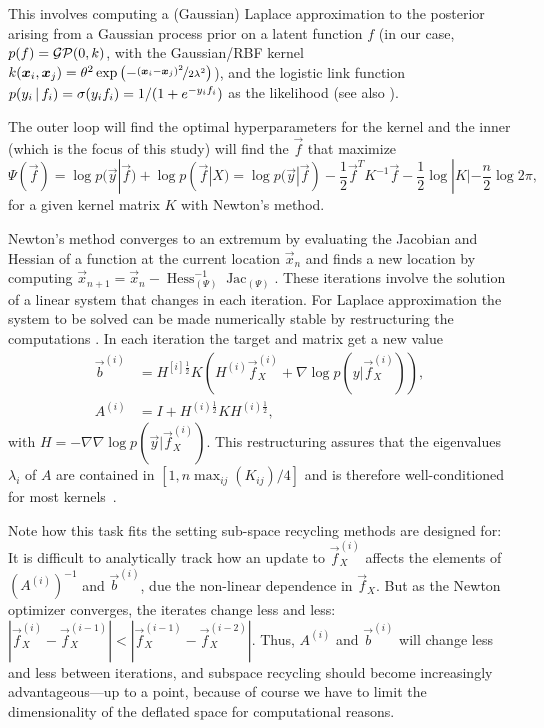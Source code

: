 \documentclass{article}
\begin{document}
This involves computing a (Gaussian) Laplace approximation to the posterior arising from a Gaussian process prior on a latent function $f$ (in our case, $p(f)=\GP(0,k)$, with the Gaussian/RBF kernel $k(\vec{x}_i,\vec{x}_j)=\theta^2 \exp \left(-\nicefrac{(\vec{x}_i-\vec{x}_j)^2}{2\lambda^2}\right)$), and the logistic link function $p(y_i \g f_i) = \sigma(y_i f_i) = 1/(1+e^{-y_if_i})$ as the likelihood (see also \cite[][.3, which also outlines the explicit algorithm]{RW-GPML}). 

The outer loop will find the optimal hyperparameters for the kernel and the inner (which is the focus of this study) will find the $\vec{f}$ that maximize
\begin{equation}
\Psi(\vec{f})=\log p(\vec{y}|\vec{f}) + \log p(\vec{f}|X)=\log p(\vec{y}|\vec{f})-\frac{1}{2}\vec{f}^TK^{-1}\vec{f} - \frac{1}{2}\log |K| -\frac{n}{2} \log 2\pi,
\label{eq:obj}
\end{equation}
for a given kernel matrix $K$ with Newton's method.

Newton's method converges to an extremum by evaluating the Jacobian and Hessian of a function at the current location $\vec{x}_n$ and finds a new location by computing $\vec{x}_{n+1}=\vec{x}_n-\operatorname{Hess}_{(\Psi)}^{-1}\operatorname{Jac}_{(\Psi)}$. These iterations involve the solution of a linear system that changes in each iteration.
For Laplace approximation the system to be solved can be made numerically stable by restructuring the computations \cite{kuss06}. In each iteration the target and matrix get a new value 
\begin{align}
\vec{b}^{(i)} &=H^{[i] \frac{1}{2}}K(H^{(i)}\vec{f}_{X}^{(i)} + \nabla \log p(y|\vec{f}_X^{(i)})),\\
A^{(i)} &=I+H^{(i)\frac{1}{2}}K H^{(i) \frac{1}{2}},
\label{eq:linsys}
\end{align}
with $H=-\nabla \nabla \log p(\vec{y}|\vec{f}_X^{(i)})$. This restructuring assures that the eigenvalues $\lambda_i$ of $A$ are contained in $[1,n \max_{ij}(K_{ij})/4]$ and is therefore well-conditioned for most kernels~\cite{RW-GPML}. 

Note how this task fits the setting sub-space recycling methods are designed for: It is difficult to analytically track how an update to $\vec{f}_X^{(i)}$ affects the elements of $(A^{(i)})^{-1}$ and $\vec{b}^{(i)}$, due the non-linear dependence in $\vec{f}_X$. But as the Newton optimizer converges, the iterates change less and less: $|\vec{f}_X^{(i)}-\vec{f}_X^{(i-1)}|<|\vec{f}_X^{(i-1)}-\vec{f}_X^{(i-2)}|$. Thus, $A^{(i)}$ and $\vec{b}^{(i)}$ will change less and less between iterations, and subspace recycling should become increasingly advantageous---up to a point, because of course we have to limit the dimensionality of the deflated space for computational reasons.
\end{document}
